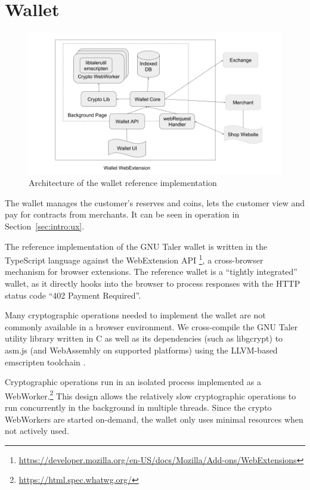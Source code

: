 \section{Wallet}
\begin{figure}
    \includegraphics[width=\textwidth]{diagrams/taler-diagram-wallet.png}
    \caption{Architecture of the wallet reference implementation}
\end{figure}

The wallet manages the customer's reserves and coins, lets the customer view
and pay for contracts from merchants.  It can be seen in operation in
Section~\ref{sec:intro:ux}.

The reference implementation of the GNU Taler wallet is written in the
TypeScript language against the WebExtension API%
\footnote{\url{https://developer.mozilla.org/en-US/docs/Mozilla/Add-ons/WebExtensions}}, a cross-browser mechanism for
browser extensions.  The reference wallet is a ``tightly integrated'' wallet, as it directly hooks into
the browser to process responses with the HTTP status code ``402 Payment Required''.

Many cryptographic operations needed to implement the wallet are not commonly
available in a browser environment.  We cross-compile the GNU Taler utility
library written in C as well as its dependencies (such as libgcrypt) to asm.js
(and WebAssembly on supported platforms) using the LLVM-based emscripten
toolchain \cite{zakai2011emscripten}.

Cryptographic operations run in an isolated process implemented as a
WebWorker.\footnote{\url{https://html.spec.whatwg.org/}}  This design allows
the relatively slow cryptographic operations to run concurrently in the
background in multiple threads.  Since the crypto WebWorkers are started on-demand,
the wallet only uses minimal resources when not actively used.

